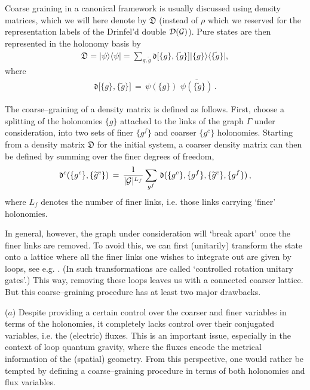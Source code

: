 \documentclass[nofootinbib,superscriptaddress,eqsecnum,tightenlines,11pt]{revtex4-1}
\def\ba{\begin{eqnarray}}
\def\ea{\end{eqnarray}}
\renewcommand{\tilde}{\widetilde}
\def\D{\mathfrak{D}}
\begin{document}
Coarse graining in a canonical framework is usually discussed using density matrices, which we will here denote by $\D$ (instead of $\rho$ which we reserved for the representation labels of the Drinfel'd double ${\cal D}({\cal G})$). 
Pure states are then represented in the holonomy basis by
\ba\label{pureD}
\D = \Big|\psi \Big\rangle\Big\langle \psi\Big| = \sum_{g,\tilde g} \mathfrak{d}\Big[\{ g\}, \{\tilde g\}\Big]\Big| \{ g\}\Big\rangle\Big\langle\{ \tilde g\}\Big|,
\ea
where
\ba
 \mathfrak{d}\Big[\{ g\}, \{\tilde g\}\Big]\,=\, \psi( \{ g\})\,\, \overline{  \psi( \{ \tilde g\}) } \, .
\ea

The coarse--graining of a density matrix is defined as follows. 
First, choose a splitting of the holonomies $\{ g\}$ attached to the links of the graph $\Gamma$ under consideration, into two sets of finer $\{ g^f\}$ and coarser $\{ g^c\}$ holonomies. 
Starting from a density matrix $\D$ for the initial system, a coarser density matrix can then be defined by summing over the finer degrees of freedom,
\ba\label{cdensity}
\mathfrak{d}^c( \{g^c\}, \{ \tilde g^c\}) \,=\, \frac{1}{|{\cal G}|^{L_f}} \sum_{g^f}  \, \mathfrak{d}( \{g^c\}, \{g^f\}, \{\tilde g^c\}, \{g^f\}) \,,
\ea
where $L_f$ denotes the number of finer links, i.e. those links carrying `finer' holonomies. 

In general, however, the graph under consideration will `break apart' once the finer links are removed.
To avoid this, we can first (unitarily) transform the state onto a lattice where all the finer links one wishes to integrate out are given  by loops, see e.g.  \cite{EteraCG,Ashley}. (In \cite{Ashley} such transformations are called `controlled rotation unitary gates'.) 
This way, removing these loops leaves us with a connected coarser lattice. But this coarse--graining procedure has at least two major drawbacks. 

($a$) Despite providing a certain control over the coarser and finer variables in terms of the holonomies, it completely lacks  control over their conjugated variables, i.e. the (electric) fluxes. 
This is an important issue, especially in the context of loop quantum gravity, where the fluxes encode the metrical information of the (spatial) geometry. 
From this perspective, one would rather be tempted by defining a coarse--graining procedure in terms of both holonomies and flux variables.
\end{document}
